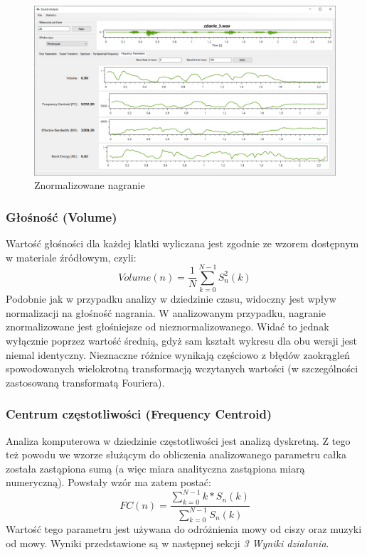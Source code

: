 \documentclass[a4paper]{article}
\begin{document}
\begin{figure}[H]
  \includegraphics[width=\linewidth]{images/03normalized.png}
  \caption{Znormalizowane nagranie}
\end{figure}

\subsubsection{Głośność (Volume)}
Wartość głośności dla każdej klatki wyliczana jest zgodnie ze wzorem dostępnym w materiale źródłowym, czyli:
\begin{equation}
Volume(n) = \frac{1}{N} \sum_{k=0}^{N-1}S_n^2(k)
\end{equation}
Podobnie jak w przypadku analizy w dziedzinie czasu, widoczny jest wpływ normalizacji na głośność nagrania. W analizowanym przypadku, nagranie znormalizowane jest głośniejsze od nieznormalizowanego. Widać to jednak wyłącznie poprzez wartość średnią, gdyż sam kształt wykresu dla obu wersji jest niemal identyczny. Nieznaczne różnice wynikają częściowo z błędów zaokrągleń spowodowanych wielokrotną transformacją wczytanych wartości (w szczególności zastosowaną transformatą Fouriera).

\subsubsection{Centrum częstotliwości (Frequency Centroid)}
Analiza komputerowa w dziedzinie częstotliwości jest analizą dyskretną. Z tego też powodu we wzorze służącym do obliczenia analizowanego parametru całka została zastąpiona sumą (a więc miara analityczna zastąpiona miarą numeryczną). Powstały wzór ma zatem postać:
\begin{equation}
FC(n) = \frac{\sum_{k=0}^{N-1}k*S_n(k)}{\sum_{k=0}^{N-1}S_n(k)}
\end{equation}
Wartość tego parametru jest używana do odróżnienia mowy od ciszy oraz muzyki od mowy. Wyniki przedstawione są w następnej sekcji \textit{3 Wyniki działania}.
\end{document}
